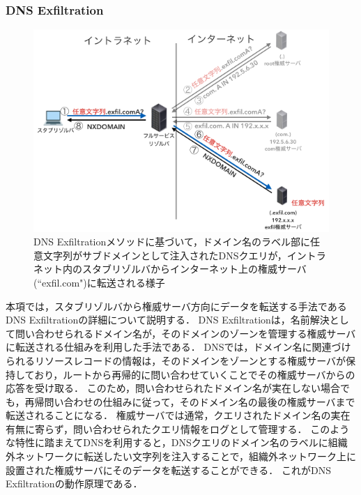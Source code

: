 \subsubsection{DNS Exfiltration}
\label{sec:dns-exfiltration}
\begin{figure}[bhtp]
 \centering
 \includegraphics[scale=0.6]{figure/dns-exfiltration.png}
 \caption[DNS Exfiltrationの概略図]{DNS Exfiltrationメソッドに基づいて，ドメイン名のラベル部に任意文字列がサブドメインとして注入されたDNSクエリが，イントラネット内のスタブリゾルバからインターネット上の権威サーバ(``exfil.com")に転送される様子}
 \label{fig:dns-exfiltration}
\end{figure}

本項では，スタブリゾルバから権威サーバ方向にデータを転送する手法であるDNS Exfiltrationの詳細について説明する．
DNS Exfiltrationは，名前解決として問い合わせられるドメイン名が，そのドメインのゾーンを管理する権威サーバに転送される仕組みを利用した手法である．
DNSでは，ドメイン名に関連づけられるリソースレコードの情報は，そのドメインをゾーンとする権威サーバが保持しており，ルートから再帰的に問い合わせていくことでその権威サーバからの応答を受け取る．
このため，問い合わせられたドメイン名が実在しない場合でも，再帰問い合わせの仕組みに従って，そのドメイン名の最後の権威サーバまで転送されることになる．
権威サーバでは通常，クエリされたドメイン名の実在有無に寄らず，問い合わせられたクエリ情報をログとして管理する．
このような特性に踏まえてDNSを利用すると，DNSクエリのドメイン名のラベルに組織外ネットワークに転送したい文字列を注入することで，組織外ネットワーク上に設置された権威サーバにそのデータを転送することができる．
これがDNS Exfiltrationの動作原理である．

